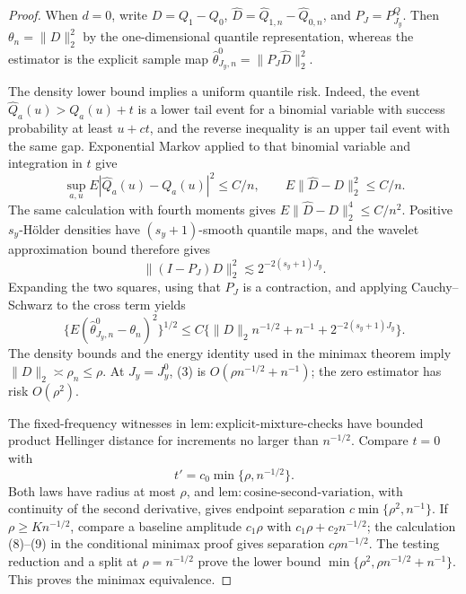 \documentclass{article}
\begin{document}
\begin{proof}
When \(d=0\), write \(D=Q_{1}-Q_{0}\), \(\widehat D=\widehat Q_{1,n}-\widehat Q_{0,n}\), and \(P_J=P^Q_{J_y}\). Then \(\theta_n=\|D\|_2^2\) by the one-dimensional quantile representation, whereas the estimator is the explicit sample map \(\widehat\theta^0_{J_y,n}=\|P_J\widehat D\|_2^2\).

The density lower bound implies a uniform quantile risk. Indeed, the event \(\widehat Q_a(u)>Q_a(u)+t\) is a lower tail event for a binomial variable with success probability at least \(u+ct\), and the reverse inequality is an upper tail event with the same gap. Exponential Markov applied to that binomial variable and integration in \(t\) give
\[
\sup_{a,u}E|\widehat Q_a(u)-Q_a(u)|^2\le C/n,
\qquad E\|\widehat D-D\|_2^2\le C/n.                                \tag{1}
\]
The same calculation with fourth moments gives \(E\|\widehat D-D\|_2^4\le C/n^2\). Positive \(s_y\)-H\"older densities have \((s_y+1)\)-smooth quantile maps, and the wavelet approximation bound therefore gives
\[
\|(I-P_J)D\|_2^2\lesssim2^{-2(s_y+1)J_y}.                            \tag{2}
\]
Expanding the two squares, using that \(P_J\) is a contraction, and applying Cauchy--Schwarz to the cross term yields
\[
\{E(\widehat\theta^0_{J_y,n}-\theta_n)^2\}^{1/2}
\le C\{\|D\|_2n^{-1/2}+n^{-1}+2^{-2(s_y+1)J_y}\}.                 \tag{3}
\]
The density bounds and the energy identity used in the minimax theorem imply \(\|D\|_2\asymp\rho_n\le\rho\). At \(J_y=J_y^0\), (3) is \(O(\rho n^{-1/2}+n^{-1})\); the zero estimator has risk \(O(\rho^2)\).

The fixed-frequency witnesses in \(\mathrm{lem{:}explicit\text{-}mixture\text{-}checks}\) have bounded product Hellinger distance for increments no larger than \(n^{-1/2}\). Compare \(t=0\) with
\[
t'=c_0\min\{\rho,n^{-1/2}\}.
\]
Both laws have radius at most \(\rho\), and \(\mathrm{lem{:}cosine\text{-}second\text{-}variation}\), with continuity of the second derivative, gives endpoint separation \(c\min\{\rho^2,n^{-1}\}\). If \(\rho\ge Kn^{-1/2}\), compare a baseline amplitude \(c_1\rho\) with \(c_1\rho+c_2n^{-1/2}\); the calculation (8)--(9) in the conditional minimax proof gives separation \(c\rho n^{-1/2}\). The testing reduction and a split at \(\rho=n^{-1/2}\) prove the lower bound \(\min\{\rho^2,\rho n^{-1/2}+n^{-1}\}\). This proves the minimax equivalence.


\end{proof}
\end{document}
